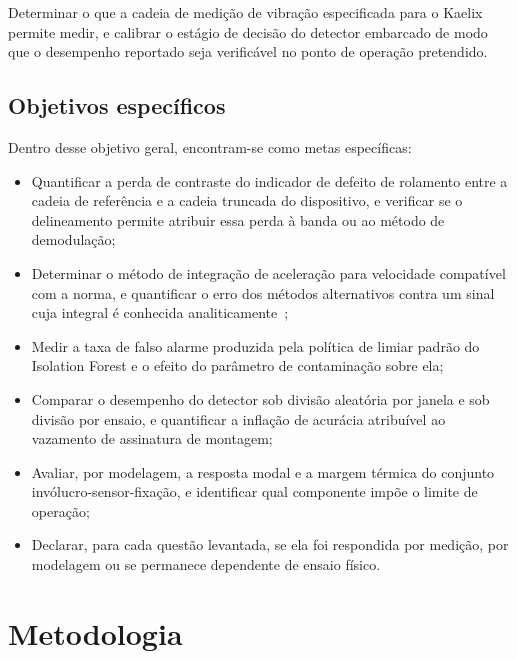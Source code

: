 Determinar o que a cadeia de medição de vibração especificada para o Kaelix permite medir,
e calibrar o estágio de decisão do detector embarcado de modo que o desempenho reportado
seja verificável no ponto de operação pretendido.

\subsection{Objetivos específicos}
\label{ssec:objetivo-especifico}

Dentro desse objetivo geral, encontram-se como metas específicas:

\begin{itemize}
    \item Quantificar a perda de contraste do indicador de defeito de rolamento entre a
          cadeia de referência e a cadeia truncada do dispositivo, e verificar se o
          delineamento permite atribuir essa perda à banda ou ao método de demodulação;

    \item Determinar o método de integração de aceleração para velocidade compatível com a
          norma, e quantificar o erro dos métodos alternativos contra um sinal cuja
          integral é conhecida analiticamente~\cite{brandt2014,iso208163_2022};

    \item Medir a taxa de falso alarme produzida pela política de limiar padrão do
          Isolation Forest e o efeito do parâmetro de contaminação sobre ela;

    \item Comparar o desempenho do detector sob divisão aleatória por janela e sob divisão
          por ensaio, e quantificar a inflação de acurácia atribuível ao vazamento de
          assinatura de montagem;

    \item Avaliar, por modelagem, a resposta modal e a margem térmica do conjunto
          invólucro-sensor-fixação, e identificar qual componente impõe o limite de
          operação;

    \item Declarar, para cada questão levantada, se ela foi respondida por medição, por
          modelagem ou se permanece dependente de ensaio físico.
\end{itemize}

\section{Metodologia}
\label{sec:metodologia}

